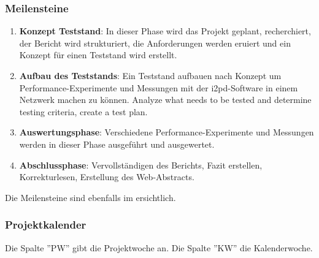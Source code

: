 \subsubsection{Meilensteine}


\begin{enumerate}
    \item \textbf{Konzept Teststand}: 
        In dieser Phase wird das Projekt geplant, recherchiert, der Bericht wird strukturiert, die Anforderungen werden eruiert und  ein Konzept für einen Teststand wird erstellt.
    \item \textbf{Aufbau des Teststands}: Ein Teststand aufbauen nach Konzept um Performance-Experimente und Messungen mit der i2pd-Software in einem Netzwerk machen zu können.
Analyze what needs to be tested and determine testing criteria, create a test plan.
    \item \textbf{Auswertungsphase}: Verschiedene Performance-Experimente und Messungen werden in dieser Phase ausgeführt und ausgewertet.
    \item \textbf{Abschlussphase}: Vervollständigen des Berichts, Fazit erstellen, Korrekturlesen, Erstellung des Web-Abstracts.
\end{enumerate}

Die Meilensteine sind ebenfalls im  ersichtlich.

\subsubsection{Projektkalender}


Die Spalte ''PW'' gibt die Projektwoche an. Die Spalte ''KW'' die Kalenderwoche.

